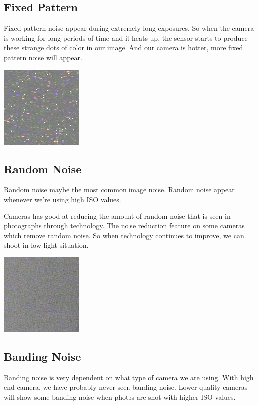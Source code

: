 \documentclass[10pt]{article}
\begin{document}
\subsection{Fixed Pattern}
Fixed pattern noise appear during extremely long exposures. So when the camera is working for long periods of time and it heats up, the sensor starts to produce these strange dots of color in our image. And our camera is hotter, more fixed pattern noise will appear.
\begin{center}
	\includegraphics{fix.png}
\end{center}


\subsection{Random Noise}
Random noise maybe the most common image noise. Random noise appear whenever we’re using high ISO values.

Cameras has good at reducing the amount of random noise that is seen in photographs through technology. The noise reduction feature on some cameras which remove random noise. So when technology continues to improve, we can shoot in low light situation. 

\begin{center}
	\includegraphics{random.png}
\end{center}

\subsection{Banding Noise}
Banding noise is very dependent on what type of camera we are using. With high end camera, we have probably never seen banding noise. Lower quality cameras will show some banding noise when photos are shot with higher ISO values.
\end{document}

